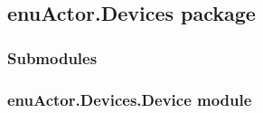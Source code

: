 \documentclass[letterpaper,10pt,english]{sphinxmanual}
\begin{document}
\subsection{enuActor.Devices package}
\label{enuActor.Devices:enuactor-devices-package}\label{enuActor.Devices::doc}

\subsubsection{Submodules}
\label{enuActor.Devices:submodules}

\subsubsection{enuActor.Devices.Device module}
\label{enuActor.Devices:enuactor-devices-device-module}\label{enuActor.Devices:module-enuActor.Devices.Device}
\end{document}
